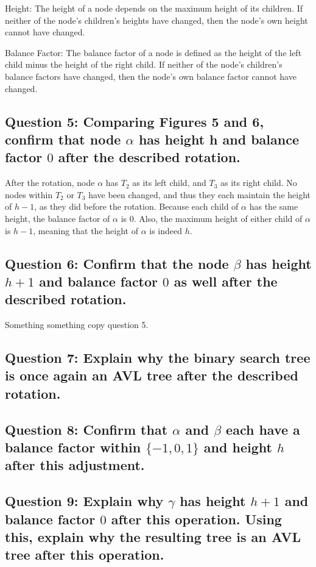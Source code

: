 \documentclass[a4paper, 12pt, titlepage]{article}
\begin{document}
Height: 
The height of a node depends on the maximum height of its children. 
If neither of the node's children's heights have changed, 
then the node's own height cannot have changed.

Balance Factor: 
The balance factor of a node is defined as the height of the left child minus the height of the right child. 
If neither of the node's children's balance factors have changed, 
then the node's own balance factor cannot have changed.

\subsection*{Question 5: Comparing Figures 5 and 6, confirm that node $\alpha$ has height h and balance factor $0$ after the described rotation.} 

After the rotation, 
node $\alpha$ has $T_2$ as its left child, 
and $T_3$ as its right child. 
No nodes within $T_2$ or $T_3$ have been changed, 
and thus they each maintain the height of $h-1$, 
as they did before the rotation. 
Because each child of $\alpha$ has the same height, 
the balance factor of $\alpha$ is $0$. 
Also, 
the maximum height of either child of $\alpha$ is $h-1$, 
meaning that the height of $\alpha$ is indeed $h$.

\subsection*{Question 6: Confirm that the node $\beta$ has height $h+1$ and balance factor $0$ as well after the described rotation.} 

Something something copy question 5.

\subsection*{Question 7: Explain why the binary search tree is once again an AVL tree after the described rotation.} 

\subsection*{Question 8: Confirm that $\alpha$ and $\beta$ each have a balance factor within $\{−1, 0, 1\}$ and height $h$ after this adjustment.} 

\subsection*{Question 9: Explain why $\gamma$ has height $h+1$ and balance factor $0$ after this operation. Using this, explain why the resulting tree is an AVL tree after this operation.} 
\end{document}
